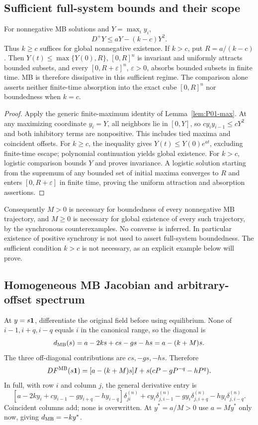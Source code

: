 \subsection{Sufficient full-system bounds and their scope}
\label{slot:P08-3}
\begin{proposition}
\label{prop:P08-bounds}
For nonnegative MB solutions and $Y=\max_i y_i$,
\begin{equation}
 D^+Y\le aY-(k-c)Y^2.\label{eq:P08-maximum}
\end{equation}
Thus $k\ge c$ suffices for global nonnegative existence. If $k>c$,
put $R=a/(k-c)$. Then $Y(t)\le\max\{Y(0),R\}$, $[0,R]^n$ is
invariant and uniformly attracts bounded subsets, and every
$[0,R+\varepsilon]^n$, $\varepsilon>0$, absorbs bounded subsets in
finite time. MB is therefore dissipative in this sufficient regime.
The comparison alone asserts neither finite-time absorption into the
exact cube $[0,R]^n$ nor boundedness when $k=c$.
\end{proposition}
\begin{proof}
Apply the generic finite-maximum identity of Lemma~\ref{lem:P01-max}.
At any maximizing coordinate $y_i=Y$, all neighbors lie in $[0,Y]$,
so $cy_i y_{i-1}\le cY^2$ and both inhibitory terms are nonpositive.
This includes tied maxima and coincident offsets. For $k\ge c$, the
inequality gives $Y(t)\le Y(0)e^{at}$, excluding finite-time escape;
polynomial continuation yields global existence. For $k>c$, logistic
comparison bounds $Y$ and proves invariance. A logistic solution
starting from the supremum of any bounded set of initial maxima
converges to $R$ and enters $[0,R+\varepsilon]$ in finite time,
proving the uniform attraction and absorption assertions.
\end{proof}
Consequently $M>0$ is necessary for boundedness of every nonnegative
MB trajectory, and $M\ge0$ is necessary for global existence of every
such trajectory, by the synchronous counterexamples. No converse is
inferred. In particular existence of positive synchrony is not used to
assert full-system boundedness. The sufficient condition $k>c$ is not
necessary, as an explicit example below will prove.

\subsection{Homogeneous MB Jacobian and arbitrary-offset spectrum}
\label{slot:P08-4}
At $y=s\mathbf{1}$, differentiate the original field before using equilibrium.
None of $i-1,i+q,i-q$ equals $i$ in the canonical range, so the diagonal is
\[
 d_{\mathrm{MB}}(s)=a-2ks+cs-gs-hs=a-(k+M)s.
\]
The three off-diagonal contributions are $cs,-gs,-hs$. Therefore
\begin{equation}
 DF^{\mathrm{MB}}(s\mathbf{1})=[a-(k+M)s]I+s(cP-gP^{-q}-hP^q).
 \label{eq:P08-state-J}
\end{equation}
In full, with row $i$ and column $j$, the general derivative entry is
\[
 [a-2ky_i+cy_{i-1}-gy_{i+q}-hy_{i-q}]\delta^{(n)}_{ji}
 +cy_i\delta^{(n)}_{j,i-1}-gy_i\delta^{(n)}_{j,i+q}
 -hy_i\delta^{(n)}_{j,i-q}.
\]
Coincident columns add; none is overwritten. At $y^*=a/M>0$ use
$a=My^*$ only now, giving $d_{\mathrm{MB}}=-ky^*$.

